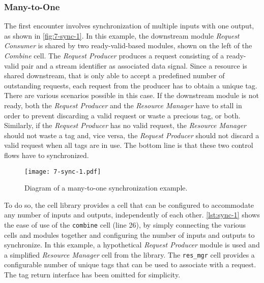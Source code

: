 \subsubsection{Many-to-One}
\label{sec:sync-1}
The first encounter involves synchronization of multiple inputs with one output, as shown in \autoref{fig:7-sync-1}. In this example, the downstream module \textit{Request Consumer} is shared by two ready-valid-based modules, shown on the left of the \textit{Combine} cell. The \textit{Request Producer} produces a request consisting of a ready-valid pair and a stream identifier as associated data signal. Since a resource is shared downstream, that is only able to accept a predefined number of outstanding requests, each request from the producer has to obtain a unique tag.\\
There are various scenarios possible in this case. If the downstream module is not ready, both the \textit{Request Producer} and the \textit{Resource Manager} have to stall in order to prevent discarding a valid request or waste a precious tag, or both. Similarly, if the \textit{Request Producer} has no valid request, the \textit{Resource Manager} should not waste a tag and, vice versa, the \textit{Request Producer} should not discard a valid request when all tags are in use. The bottom line is that these two control flows have to synchronized.

\begin{figure}[H]
  \centering
  \texttt{[image: 7-sync-1.pdf]}
  \caption{Diagram of a many-to-one synchronization example.}
  \label{fig:7-sync-1}
\end{figure}

To do so, the cell library provides a cell that can be configured to accommodate any number of inputs and outputs, independently of each other. \autoref{lst:sync-1} shows the ease of use of the \texttt{combine} cell (line 26), by simply connecting the various cells and modules together and configuring the number of inputs and outputs to synchronize. In this example, a hypothetical \textit{Request Producer} module is used and a simplified \textit{Resource Manager} cell from the library. The \texttt{res\_mgr} cell provides a configurable number of unique tags that can be used to associate with a request. The tag return interface has been omitted for simplicity.

